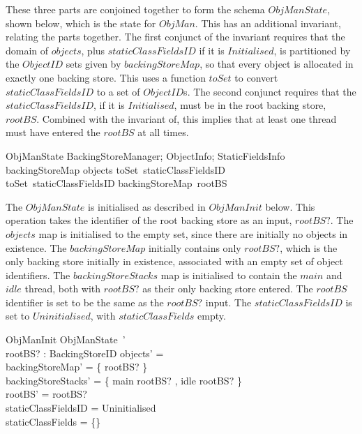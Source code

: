 These three parts are conjoined together to form the schema
$ObjManState$, shown below, which is the state for $ObjMan$.
This has an additional invariant, relating the parts together.
The first conjunct of the invariant requires that the domain of
$objects$, plus $staticClassFieldsID$ if it is $Initialised$, is
partitioned by the $ObjectID$ sets given by $backingStoreMap$, so that
every object is allocated in exactly one backing store.
This uses a function $toSet$ to convert $staticClassFieldsID$ to a set
of $ObjectID$s.
The second conjunct requires that the $staticClassFieldsID$, if it is
$Initialised$, must be in the root backing store, $rootBS$.
Combined with the invariant of, this implies that at least one thread
must have entered the $rootBS$ at all times.
\begin{schema}{ObjManState}
	BackingStoreManager; ObjectInfo; StaticFieldsInfo
\where
	backingStoreMap \partition \dom objects \cup toSet~staticClassFieldsID \\
	toSet~staticClassFieldsID \subseteq backingStoreMap~rootBS
\end{schema}

The $ObjManState$ is initialised as described in $ObjManInit$ below.
This operation takes the identifier of the root backing store as an
input, $rootBS?$.
The $objects$ map is initialised to the empty set, since there are
initially no objects in existence.
The $backingStoreMap$ initially contains only $rootBS?$, which is the
only backing store initially in existence, associated with an empty
set of object identifiers.
The $backingStoreStacks$ map is initialised to contain the $main$ and
$idle$ thread, both with $rootBS?$ as their only backing store
entered.
The $rootBS$ identifier is set to be the same as the $rootBS?$ input.
The $staticClassFieldsID$ is set to $Uninitialised$, with
$staticClassFields$ empty.
\begin{schema}{ObjManInit}
	ObjManState~' \\
	rootBS? : BackingStoreID
\where
	objects' = \emptyset \\
	backingStoreMap' = \{ rootBS? \mapsto \emptyset \} \\
	backingStoreStacks' = \{ main \mapsto \langle rootBS? \rangle, idle \mapsto \langle rootBS? \rangle \} \\
	rootBS' = rootBS? \\
	staticClassFieldsID = Uninitialised \\
	staticClassFields = \{\}
\end{schema}

